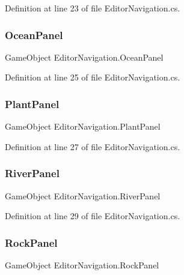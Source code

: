 Definition at line 23 of file Editor\+Navigation.\+cs.

\mbox{\label{class_editor_navigation_acea8a9fb2040eac2fee9342f895e6aee}} 
\subsubsection{Ocean\+Panel}
{\footnotesize\ttfamily Game\+Object Editor\+Navigation.\+Ocean\+Panel}



Definition at line 25 of file Editor\+Navigation.\+cs.

\mbox{\label{class_editor_navigation_a870d714f1238f018c87d330b0ab7edbe}} 
\subsubsection{Plant\+Panel}
{\footnotesize\ttfamily Game\+Object Editor\+Navigation.\+Plant\+Panel}



Definition at line 27 of file Editor\+Navigation.\+cs.

\mbox{\label{class_editor_navigation_a3510e2b24dfa64517924dc2a6e6bfcc9}} 
\subsubsection{River\+Panel}
{\footnotesize\ttfamily Game\+Object Editor\+Navigation.\+River\+Panel}



Definition at line 29 of file Editor\+Navigation.\+cs.

\mbox{\label{class_editor_navigation_a44dd28f73de43096130772de734b6539}} 
\subsubsection{Rock\+Panel}
{\footnotesize\ttfamily Game\+Object Editor\+Navigation.\+Rock\+Panel}



